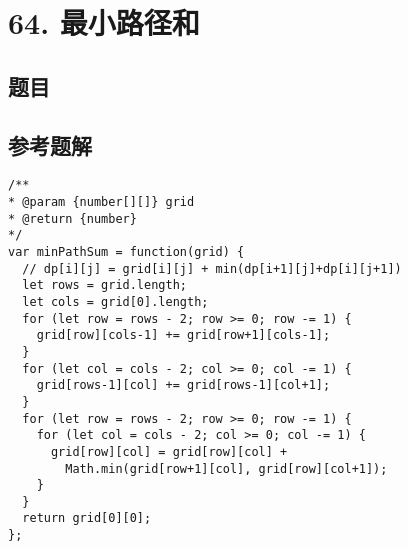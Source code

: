 \newpage
\section{64. 最小路径和}
\label{leetcode:64}

\subsection{题目}

\subsection{参考题解}

\begin{verbatim}
/**
* @param {number[][]} grid
* @return {number}
*/
var minPathSum = function(grid) {
  // dp[i][j] = grid[i][j] + min(dp[i+1][j]+dp[i][j+1])
  let rows = grid.length;
  let cols = grid[0].length;
  for (let row = rows - 2; row >= 0; row -= 1) {
    grid[row][cols-1] += grid[row+1][cols-1];
  }
  for (let col = cols - 2; col >= 0; col -= 1) {
    grid[rows-1][col] += grid[rows-1][col+1];
  }
  for (let row = rows - 2; row >= 0; row -= 1) {
    for (let col = cols - 2; col >= 0; col -= 1) {
      grid[row][col] = grid[row][col] +
        Math.min(grid[row+1][col], grid[row][col+1]);
    }
  }
  return grid[0][0];
};
\end{verbatim}
